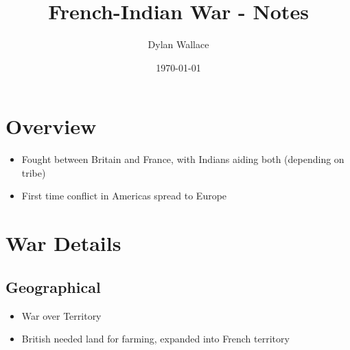 \documentclass[letterpaper]{article}
\author{Dylan Wallace}
\date{\today}
\title{French-Indian War - Notes}
\renewcommand{\tableofcontents}{}
\begin{document}
\tableofcontents



\section{Overview}
\label{sec:org25fb9d1}
\begin{itemize}
\item Fought between Britain and France, with Indians aiding both (depending on tribe)
\item First time conflict in Americas spread to Europe
\end{itemize}

\section{War Details}
\label{sec:org11c6370}
\subsection{Geographical}
\label{sec:org5b1afe6}
\begin{itemize}
\item War over Territory
\item British needed land for farming, expanded into French territory
\end{itemize}
\end{document}

